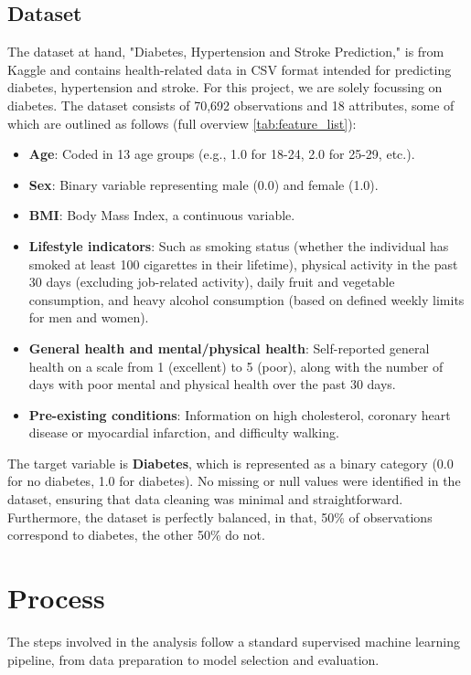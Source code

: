 \documentclass[a4paper,12pt]{article}
\begin{document}
\subsection{Dataset}
The dataset at hand, "Diabetes, Hypertension and Stroke Prediction," is from Kaggle and contains 
health-related data in CSV format intended for predicting diabetes, hypertension and stroke. 
For this project, we are solely focussing on diabetes. The dataset consists of 70,692 observations 
and 18 attributes, some of which are outlined as follows (full overview \ref{tab:feature_list}):
\begin{itemize}
    \item \textbf{Age}: Coded in 13 age groups (e.g., 1.0 for 18-24, 2.0 for 25-29, etc.).
    \item \textbf{Sex}: Binary variable representing male (0.0) and female (1.0).
    \item \textbf{BMI}: Body Mass Index, a continuous variable.
    \item \textbf{Lifestyle indicators}: Such as smoking status (whether the individual has smoked at least 100 cigarettes in their lifetime), physical activity in the past 30 days (excluding job-related activity), daily fruit and vegetable consumption, and heavy alcohol consumption (based on defined weekly limits for men and women).
    \item \textbf{General health and mental/physical health}: Self-reported general health on a scale from 1 (excellent) to 5 (poor), along with the number of days with poor mental and physical health over the past 30 days.
    \item \textbf{Pre-existing conditions}: Information on high cholesterol, coronary heart disease or myocardial infarction, and difficulty walking.
\end{itemize}

The target variable is \textbf{Diabetes}, which is represented as a binary category 
(0.0 for no diabetes, 1.0 for diabetes). No missing or null values were identified in the dataset, 
ensuring that data cleaning was minimal and straightforward. Furthermore, the dataset is perfectly 
balanced, in that, 50\% of observations correspond to diabetes, the other 50\% do not.

\section{Process}
The steps involved in the analysis follow a standard supervised machine learning pipeline, 
from data preparation to model selection and evaluation.
\end{document}
